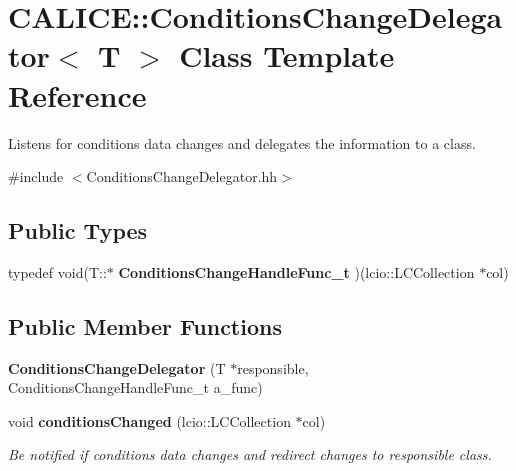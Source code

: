 \section{CALICE::ConditionsChangeDelegator$<$ T $>$ Class Template Reference}
\label{classCALICE_1_1ConditionsChangeDelegator}


Listens for conditions data changes and delegates the information to a class.  


{\ttfamily \#include $<$ConditionsChangeDelegator.hh$>$}\subsection*{Public Types}
\begin{DoxyCompactItemize}
\item 
typedef void(T::$\ast$ {\bfseries ConditionsChangeHandleFunc\_\-t} )(lcio::LCCollection $\ast$col)\label{classCALICE_1_1ConditionsChangeDelegator_afd68318ab8917fd1f97d18ae8204c167}

\end{DoxyCompactItemize}
\subsection*{Public Member Functions}
\begin{DoxyCompactItemize}
\item 
{\bfseries ConditionsChangeDelegator} (T $\ast$responsible, ConditionsChangeHandleFunc\_\-t a\_\-func)\label{classCALICE_1_1ConditionsChangeDelegator_a724d008ad96b77fa64b8716545052b57}

\item 
void {\bf conditionsChanged} (lcio::LCCollection $\ast$col)
\begin{DoxyCompactList}\small\item\em Be notified if conditions data changes and redirect changes to responsible class. \item\end{DoxyCompactList}\end{DoxyCompactItemize}
